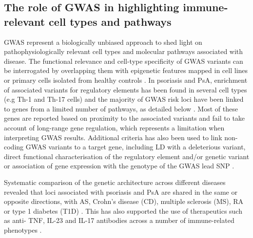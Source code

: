 \subsection{The role of GWAS in highlighting immune-relevant cell types and pathways}

GWAS represent a biologically unbiased approach to shed light on pathophysiologically relevant cell types and molecular pathways associated with disease. The functional relevance and cell-type specificity of GWAS variants can be interrogated by overlapping them with epigenetic features mapped in cell lines or primary cells isolated from healthy controls \parencite{Farh2015}. In psoriasis and PsA, enrichment of associated variants for regulatory elements has been found in several cell types (e.g Th-1 and Th-17 cells) and the majority of GWAS risk loci have been linked to genes from a limited number of pathways, as detailed below \parencite{Tsoi2017,Capon2017}. Most of these genes are reported based on proximity to the associated variants and fail to take account of long-range gene regulation, which represents a limitation when interpreting GWAS results. Additional criteria has also been used to link non-coding GWAS variants to a target gene, including LD with a deleterious variant, direct functional characterisation of the regulatory element and/or genetic variant or association of gene expression with the genotype of the GWAS lead SNP \parencite{Capon2008,Tsoi2012,Tsoi2017,Meglio2011}.

Systematic comparison of the genetic architecture across different diseases revealed that loci associated with psoriasis and PsA are shared in the same or opposite directions, with AS, Crohn’s disease (CD), multiple sclerosis (MS), RA or type 1 diabetes (T1D) \parencite{Tsoi2012}. This has also supported the use of therapeutics such as anti- TNF, IL-23 and IL-17 antibodies across a number of immune-related phenotypes \parencite{Visscher2017}.






